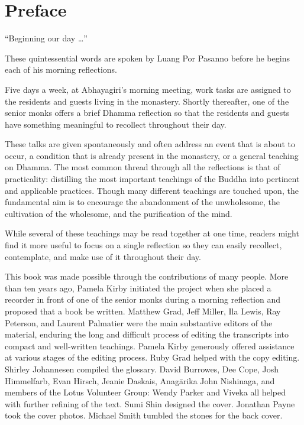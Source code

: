 \chapter*{Preface}

``Beginning our day \ldots{}''

These quintessential words are spoken by Luang Por Pasanno before he
begins each of his morning reflections.

Five days a week, at Abhayagiri's morning meeting, work tasks are
assigned to the residents and guests living in the monastery. Shortly
thereafter, one of the senior monks offers a brief Dhamma reflection so
that the residents and guests have something meaningful to recollect
throughout their day.

These talks are given spontaneously and often address an event that is
about to occur, a condition that is already present in the monastery, or
a general teaching on Dhamma. The most common thread through all the
reflections is that of practicality: distilling the most important
teachings of the Buddha into pertinent and applicable practices. Though
many different teachings are touched upon, the fundamental aim is to
encourage the abandonment of the unwholesome, the cultivation of the
wholesome, and the purification of the mind.

While several of these teachings may be read together at one time,
readers might find it more useful to focus on a single reflection so
they can easily recollect, contemplate, and make use of it throughout
their day.

This book was made possible through the contributions of many people.
More than ten years ago, Pamela Kirby initiated the project when she
placed a recorder in front of one of the senior monks during a morning
reflection and proposed that a book be written. Matthew Grad, Jeff
Miller, Ila Lewis, Ray Peterson, and Laurent Palmatier were the main
substantive editors of the material, enduring the long and difficult
process of editing the transcripts into compact and well-written
teachings. Pamela Kirby generously offered assistance at various stages
of the editing process. Ruby Grad helped with the copy editing. Shirley
Johannesen compiled the glossary. David Burrowes, Dee Cope, Josh
Himmelfarb, Evan Hirsch, Jeanie Daskais, Anagārika John Nishinaga, and
members of the \mbox{Lotus} \mbox{Volunteer} \mbox{Group}: Wendy Parker
and Viveka all helped with further refining of the text. Sumi Shin
designed the cover.  Jonathan Payne took the cover photos. Michael Smith
tumbled the stones for the back cover.

